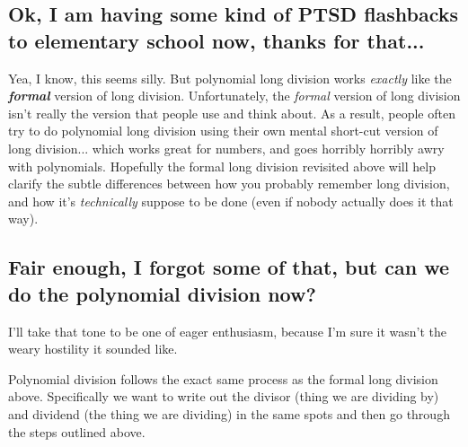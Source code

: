 \documentclass{ximeraXloud}
\begin{document}
    \subsection*{Ok, I am having some kind of PTSD flashbacks to elementary school now, thanks for that...}
        Yea, I know, this seems silly. But polynomial long division works \textit{exactly} like the \textit{\textbf{formal}} version of long division. Unfortunately, the \textit{formal} version of long division isn't really the version that people use and think about. As a result, people often try to do polynomial long division using their own mental short-cut version of long division... which works great for numbers, and goes horribly horribly awry with polynomials. Hopefully the formal long division revisited above will help clarify the subtle differences between how you probably remember long division, and how it's \textit{technically} suppose to be done (even if nobody actually does it that way).
    
    \subsection*{Fair enough, I forgot some of that, but can we do the polynomial division now?}
        I'll take that tone to be one of eager enthusiasm, because I'm sure it wasn't the weary hostility it sounded like.
        
        Polynomial division follows the exact same process as the formal long division above. Specifically we want to write out the divisor (thing we are dividing by) and dividend (the thing we are dividing) in the same spots and then go through the steps outlined above.
    
\end{document}
